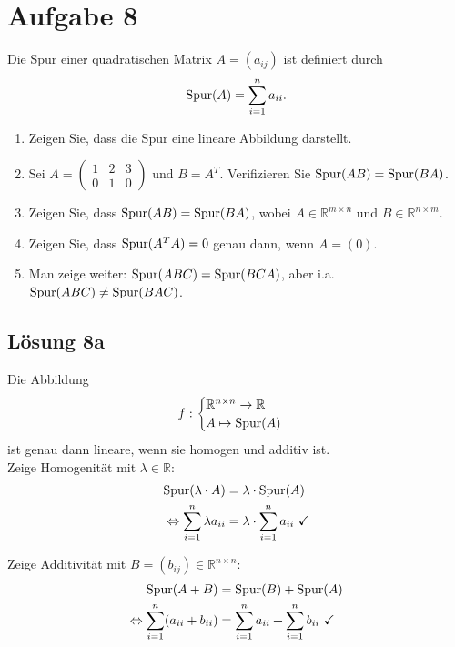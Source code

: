 \documentclass[main.tex]{subfiles}
\begin{document}
\section{Aufgabe 8}
Die Spur einer quadratischen Matrix $A=(a_{ij})$ ist definiert durch
\[
    \operatorname{Spur} (A) = \sum_{i=1}^{n} a_{ii}.
\]

\begin{enumerate}
    \item Zeigen Sie, dass die Spur eine lineare Abbildung darstellt.
    \item Sei $A = \begin{pmatrix}
        1 & 2 & 3 \\
        0 & 1 & 0
    \end{pmatrix}$ und $B = A^T$. Verifizieren Sie $\operatorname{Spur} (AB)= \operatorname{Spur} (BA)$.
    \item Zeigen Sie, dass $\operatorname{Spur} (AB) = \operatorname{Spur} (BA)$, wobei $A \in \mathbb{R}^{m\times n}$ und $B\in \mathbb{R}^{n\times m}$.
    \item Zeigen Sie, dass $\operatorname{Spur} (A^T A) = 0$ genau dann, wenn $A=(0)$.
    \item Man zeige weiter: $\operatorname{Spur} (ABC) = \operatorname{Spur} (BCA)$, aber i.a. $\operatorname{Spur} (ABC) \neq \operatorname{Spur} (BAC)$.
\end{enumerate}

\subsection{Lösung 8a}
Die Abbildung 
$$
    f : \begin{cases}
        \mathbb{R}^{n\times n} \to \mathbb{R}\\
        A \mapsto \operatorname{Spur} (A)
    \end{cases}
$$
ist genau dann lineare, wenn sie homogen und additiv ist.\\

Zeige Homogenität mit $\lambda \in \mathbb{R}$:
\begin{equation}
    \begin{aligned}
                        \operatorname{Spur} (\lambda \cdot A)       & = \lambda \cdot \operatorname{Spur} (A)\\
        \Leftrightarrow \sum_{i=1}^{n} \lambda a_{ii} & = \lambda \cdot \sum_{i=1}^{n} a_{ii}\ \checkmark
    \end{aligned}
\end{equation}

Zeige Additivität mit $B = (b_{ij}) \in \mathbb{R}^{n\times n}$:
\begin{equation}
    \begin{aligned}
        \operatorname{Spur} (A + B) & = \operatorname{Spur} (B) + \operatorname{Spur} (A) \\
        \Leftrightarrow \sum_{i=1}^{n} ( a_{ii} + b_{ii} ) & = \sum_{i=1}^{n} a_{ii} + \sum_{i=1}^{n} b_{ii} \ \checkmark
    \end{aligned}
\end{equation}
\end{document}
